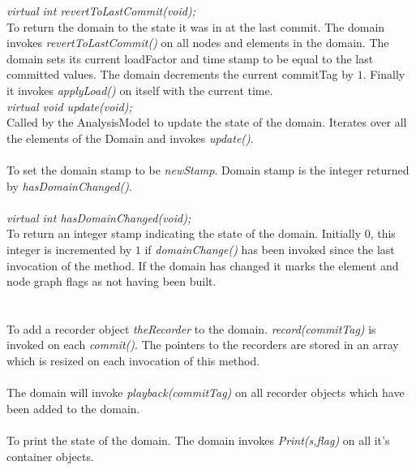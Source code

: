 {\em virtual int revertToLastCommit(void);} \\
To return the domain to the state it was in at the last commit. The
domain invokes {\em revertToLastCommit()} on all nodes and elements in
the domain. The domain sets its current loadFactor and time
stamp to be equal to the last committed values. The domain decrements
the current commitTag by $1$. Finally it invokes {\em applyLoad()}
on itself with the current time.\\

{\em virtual void update(void);} \\
Called by the AnalysisModel to update the state of the
domain. Iterates over all the elements of the Domain and invokes {\em
update()}. \\

\\
To set the domain stamp to be {\em newStamp}. Domain stamp is the
integer returned by {\em hasDomainChanged()}. \\

 \\
{\em virtual int hasDomainChanged(void);} \\
To return an integer stamp indicating the state of the
domain. Initially $0$, this integer is incremented by $1$ if  {\em
domainChange()} has been invoked since the last invocation of the
method. If the domain has changed it marks the element and node graph
flags as not having been built.\\  

 \\
\\
To add a recorder object {\em theRecorder} to the domain. {\em
record(commitTag)} is invoked on each {\em commit()}. The pointers to
the recorders are stored in an array which is resized on each
invocation of this method.\\  

\\
The domain will invoke {\em playback(commitTag)} on all recorder
objects which have been added to the domain.\\

\\
To print the state of the domain. The domain invokes {\em Print(s,flag)} on
all it's container objects. \\


